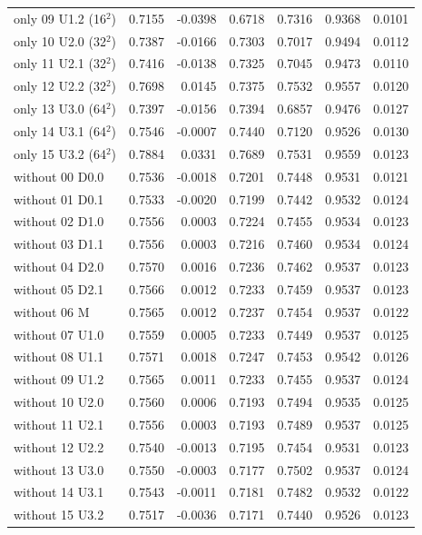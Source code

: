 {\begin{longtable}{>{\raggedright\arraybackslash}p{3.73cm}rrrrrr}
only 09 U1.2 (16$^2$) & 0.7155 & -0.0398 & 0.6718 & 0.7316 & 0.9368 & 0.0101 \\
only 10 U2.0 (32$^2$) & 0.7387 & -0.0166 & 0.7303 & 0.7017 & 0.9494 & 0.0112 \\
only 11 U2.1 (32$^2$) & 0.7416 & -0.0138 & 0.7325 & 0.7045 & 0.9473 & 0.0110 \\
only 12 U2.2 (32$^2$) & 0.7698 & 0.0145 & 0.7375 & 0.7532 & 0.9557 & 0.0120 \\
only 13 U3.0 (64$^2$) & 0.7397 & -0.0156 & 0.7394 & 0.6857 & 0.9476 & 0.0127 \\
only 14 U3.1 (64$^2$) & 0.7546 & -0.0007 & 0.7440 & 0.7120 & 0.9526 & 0.0130 \\
only 15 U3.2 (64$^2$) & 0.7884 & 0.0331 & 0.7689 & 0.7531 & 0.9559 & 0.0123 \\
without 00 D0.0 & 0.7536 & -0.0018 & 0.7201 & 0.7448 & 0.9531 & 0.0121 \\
without 01 D0.1 & 0.7533 & -0.0020 & 0.7199 & 0.7442 & 0.9532 & 0.0124 \\
without 02 D1.0 & 0.7556 & 0.0003 & 0.7224 & 0.7455 & 0.9534 & 0.0123 \\
without 03 D1.1 & 0.7556 & 0.0003 & 0.7216 & 0.7460 & 0.9534 & 0.0124 \\
without 04 D2.0 & 0.7570 & 0.0016 & 0.7236 & 0.7462 & 0.9537 & 0.0123 \\
without 05 D2.1 & 0.7566 & 0.0012 & 0.7233 & 0.7459 & 0.9537 & 0.0123 \\
without 06 M & 0.7565 & 0.0012 & 0.7237 & 0.7454 & 0.9537 & 0.0122 \\
without 07 U1.0 & 0.7559 & 0.0005 & 0.7233 & 0.7449 & 0.9537 & 0.0125 \\
without 08 U1.1 & 0.7571 & 0.0018 & 0.7247 & 0.7453 & 0.9542 & 0.0126 \\
without 09 U1.2 & 0.7565 & 0.0011 & 0.7233 & 0.7455 & 0.9537 & 0.0124 \\
without 10 U2.0 & 0.7560 & 0.0006 & 0.7193 & 0.7494 & 0.9535 & 0.0125 \\
without 11 U2.1 & 0.7556 & 0.0003 & 0.7193 & 0.7489 & 0.9537 & 0.0125 \\
without 12 U2.2 & 0.7540 & -0.0013 & 0.7195 & 0.7454 & 0.9531 & 0.0123 \\
without 13 U3.0 & 0.7550 & -0.0003 & 0.7177 & 0.7502 & 0.9537 & 0.0124 \\
without 14 U3.1 & 0.7543 & -0.0011 & 0.7181 & 0.7482 & 0.9532 & 0.0122 \\
without 15 U3.2 & 0.7517 & -0.0036 & 0.7171 & 0.7440 & 0.9526 & 0.0123 \\
\bottomrule
\end{longtable}}
